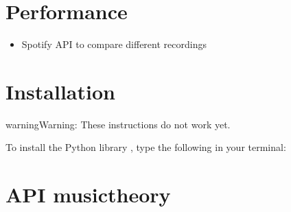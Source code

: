 \documentclass[letterpaper,10pt,english]{sphinxmanual}
\begin{document}
\section{Performance}
\label{\detokenize{6_advanced:performance}}\begin{itemize}
\item {} 
Spotify API to compare different recordings

\end{itemize}

\cleardoublepage
\begingroup
\renewcommand\chapter[1]{\endgroup}


\chapter{Bibliography}
\label{\detokenize{8_bibliography:bibliography}}\label{\detokenize{8_bibliography::doc}}



\chapter{Developers}
\label{\detokenize{index:developers}}

\section{Installation}
\label{\detokenize{install:installation}}\label{\detokenize{install::doc}}
\begin{sphinxadmonition}{warning}{Warning:}
These instructions do not work yet.
\end{sphinxadmonition}

To install the Python library , type the following in your terminal:

\begin{sphinxVerbatim}[commandchars=\\\{\}]
  
\end{sphinxVerbatim}


\section{API \sphinxhyphen{} musictheory}
\label{\detokenize{api:module-gamuth}}\label{\detokenize{api:api-musictheory}}\label{\detokenize{api::doc}}
\end{document}
